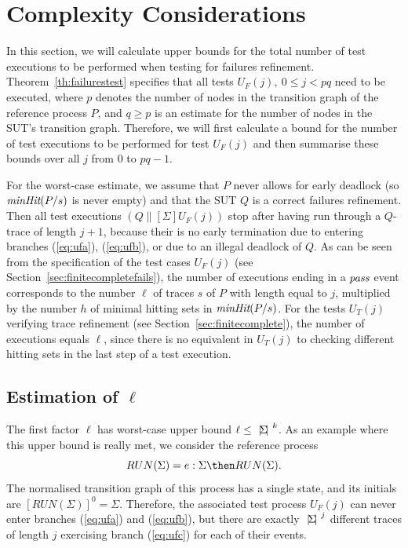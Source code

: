 \section{Complexity Considerations}
\label{sec:complexity}

In this 
section, we
 will   calculate upper bounds for the total number of test executions to be performed
 when testing for failures refinement.   Theorem~\ref{th:failurestest} specifies
 that all tests $U_F(j),\ 0\le j < pq$ need to be executed, where $p$ denotes the
 number of nodes in the transition graph of the reference process $P$, and $q\ge p$ is an estimate for the number of nodes in the SUT's transition graph. Therefore, we will first calculate a bound for the number of test executions to be performed 
 for test $U_F(j)$ and then summarise  these bounds over all $j$ from $0$ to $pq-1$.


For the worst-case estimate, we
assume that $P$ never allows for early deadlock (so $\text{\it minHit}(P/s)$ is never empty) 
and that the SUT $Q$ is a correct 
failures refinement. Then all test executions $(Q\parallel[\Sigma] U_F(j))$
stop after having run through a $Q$-trace of length $j+1$, because their is
no early termination due to entering branches (\ref{eq:ufa}), (\ref{eq:ufb}), or due to
an illegal deadlock of $Q$.
As can be seen from the specification of the test cases $U_F(j)$ (see
Section~\ref{sec:finitecompletefails}), the number of
executions ending in a ${\text{\it pass}}$ event corresponds to the number $\ell$ of
traces $s$ of $P$ with length equal to  
$j$, multiplied by the number $h$ of minimal hitting sets in
$\text{\it minHit}(P/s)$. For
the tests $U_T(j)$ verifying trace refinement (see
Section~\ref{sec:finitecomplete}), the number of executions equals $\ell$,
since there is no equivalent in $U_T(j)$ to checking different hitting sets
in the last step of a test execution.

\subsection{Estimation of $\ell$}
The first factor $\ell$ has worst-case upper bound $\ell\le {~|\! \Sigma\!|~}^k$.
As an example where this upper bound is really met, we consider the reference
process
\[
RUN(\Sigma) = e:\Sigma \then RUN(\Sigma).
\]
The normalised transition graph of this process has a single state, and its initials
are $[RUN(\Sigma)]^0 = \Sigma$. Therefore, the associated test process $U_F(j)$ can
never enter branches (\ref{eq:ufa}) and (\ref{eq:ufb}), but there are exactly
${~|\! \Sigma\!|~}^j$ different traces of length $j$ exercising branch (\ref{eq:ufc})
for each of their events.

